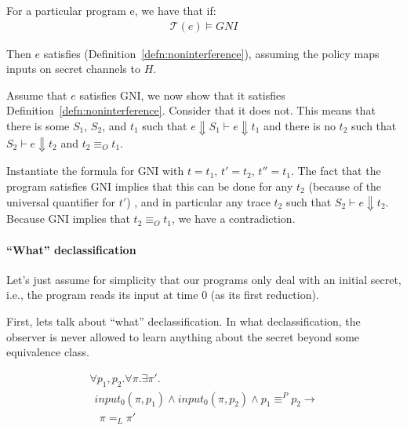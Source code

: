 \documentclass[conference]{IEEEtran}
\theoremstyle{definition}
\newcommand{\prin}{\textit{O}}
\newcommand{\traces}[1]{\mathcal{T}(#1)}
\newcommand{\tr}{t\xspace}
\newcommand{\comment}[3][\color{red}]{{#1{[{#2}: {#3}]}}}
\newcommand{\kris}[1]{\comment[\color{orange}]{kris}{#1}}
\begin{document}
\begin{Theorem}
  For a particular program e, we have that if:
  \begin{displaymath}
    \begin{array}{c}
      \traces{e} \models GNI
    \end{array}
  \end{displaymath}
  
  Then $e$ satisfies (Definition~\ref{defn:noninterference}), assuming
  the policy maps inputs on secret channels to $H$.
\end{Theorem}

\begin{Proof}
  Assume that $e$ satisfies GNI, we now show that it satisfies
  Definition~\ref{defn:noninterference}.  Consider that it does not.
  This means that there is some $S_1$, $S_2$, and $\tr_1$ such that $e
  \Downarrow S_1 \vdash e \Downarrow \tr_1$ and there is no $\tr_2$
  such that $S_2 \vdash e \Downarrow \tr_2$ and $\tr_2 \equiv_\prin
  \tr_1$.

  Instantiate the formula for GNI with $t = \tr_1$, $t' = \tr_2$, $t''
  = \tr_1$.  The fact that the program satisfies GNI implies that this
  can be done for any $\tr_2$ (because of the universal quantifier for
  $t'$) , and in particular any trace $\tr_2$ such that $S_2 \vdash e
  \Downarrow \tr_2$.  Because GNI implies that $\tr_2 \equiv_\prin
  \tr_1$, we have a contradiction.
\end{Proof}

\paragraph*{``What'' declassification}

\kris{Text out of date}

Let's just assume for simplicity that our programs only deal with an
initial secret, i.e., the program reads its input at time 0 (as its
first reduction).

First, lets talk about ``what'' declassification.  In what
declassification, the observer is never allowed to learn anything
about the secret beyond some equivalence class.

\begin{Definition}
  \label{defn:hyper-what-declass}
  \begin{displaymath}
    \begin{array}{l}
    \forall p_1, p_2. \forall \pi. \exists \pi'. \\
    ~~ input_0(\pi,p_1) \land input_0(\pi,p_2) \land p_1 \equiv^P p_2
    \rightarrow \\ 
    ~~~~\pi =_L \pi'
    \end{array}
  \end{displaymath}
\end{Definition}
\end{document}
